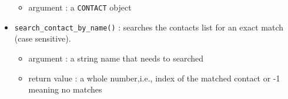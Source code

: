 \documentclass[
]{article}
\providecommand{\tightlist}{%
  \setlength{\itemsep}{0pt}\setlength{\parskip}{0pt}}
\begin{document}
\begin{itemize}
  \begin{itemize}
  \tightlist
  \item
    argument : a \texttt{CONTACT} object
  \end{itemize}
\item
  \texttt{search\_contact\_by\_name()} : searches the contacts list for
  an exact match (case sensitive).

  \begin{itemize}
  \tightlist
  \item
    argument : a string name that needs to searched
  \item
    return value : a whole number,i.e., index of the matched contact or
    -1 meaning no matches
  \end{itemize}
\end{itemize}
\end{document}
